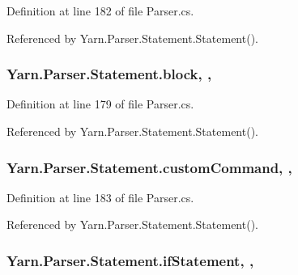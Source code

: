 Definition at line 182 of file Parser.\-cs.



Referenced by Yarn.\-Parser.\-Statement.\-Statement().

\hypertarget{a00168_ac14dfc7210974b4cd86402ed011fb0b6}{
\subsubsection[{block}]{ Yarn.\-Parser.\-Statement.\-block\hspace{0.3cm}{\ttfamily [get]}, {\ttfamily [set]}, {\ttfamily [package]}}}\label{a00168_ac14dfc7210974b4cd86402ed011fb0b6}


Definition at line 179 of file Parser.\-cs.



Referenced by Yarn.\-Parser.\-Statement.\-Statement().

\hypertarget{a00168_a8a98e7d4c66f9909da865f0e671d69f2}{
\subsubsection[{custom\-Command}]{ Yarn.\-Parser.\-Statement.\-custom\-Command\hspace{0.3cm}{\ttfamily [get]}, {\ttfamily [set]}, {\ttfamily [package]}}}\label{a00168_a8a98e7d4c66f9909da865f0e671d69f2}


Definition at line 183 of file Parser.\-cs.



Referenced by Yarn.\-Parser.\-Statement.\-Statement().

\hypertarget{a00168_a9a71577456598af0f25b23ccd02154e4}{
\subsubsection[{if\-Statement}]{ Yarn.\-Parser.\-Statement.\-if\-Statement\hspace{0.3cm}{\ttfamily [get]}, {\ttfamily [set]}, {\ttfamily [package]}}}\label{a00168_a9a71577456598af0f25b23ccd02154e4}


